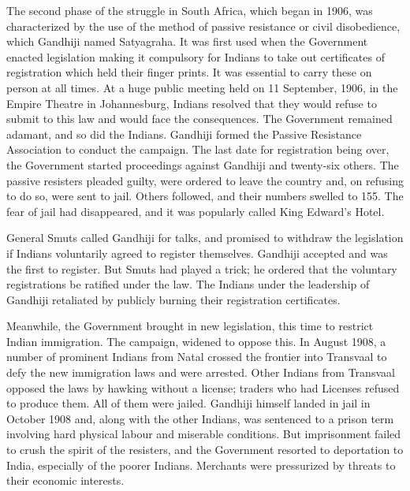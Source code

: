 The second phase of the struggle in South Africa, which began in 1906, was characterized by the use of the method of passive resistance or civil disobedience, which Gandhiji named Satyagraha. It was first used when the Government enacted legislation making it compulsory for Indians to take out certificates of registration which held their finger prints. It was essential to carry these on person at all times. At a huge public meeting held on 11 September, 1906, in the Empire Theatre in Johannesburg, Indians resolved that they would refuse to submit to this law and would face the consequences. The Government remained adamant, and so did the Indians. Gandhiji formed the Passive Resistance Association to conduct the campaign. The last date for registration being over, the Government started proceedings against Gandhiji and twenty-six others. The passive resisters pleaded guilty, were ordered to leave the country and, on refusing to do so, were sent to jail. Others followed, and their numbers swelled to 155. The fear of jail had disappeared, and it was popularly called King Edward's Hotel.

General Smuts called Gandhiji for talks, and promised to withdraw the legislation if Indians voluntarily agreed to register themselves. Gandhiji accepted and was the first to register. But Smuts had played a trick; he ordered that the voluntary registrations be ratified under the law. The Indians under the leadership of Gandhiji retaliated by publicly burning their registration certificates.

Meanwhile, the Government brought in new legislation, this time to restrict Indian immigration. The campaign, widened to oppose this. In August 1908, a number of prominent Indians from Natal crossed the frontier into Transvaal to defy the new immigration laws and were arrested. Other Indians from Transvaal opposed the laws by hawking without a license; traders who had Licenses refused to produce them. All of them were jailed. Gandhiji himself landed in jail in October 1908 and, along with the other Indians, was sentenced to a prison term involving hard physical labour and miserable conditions. But imprisonment failed to crush the spirit of the resisters, and the Government resorted to deportation to India, especially of the poorer Indians. Merchants were pressurized by threats to their economic interests.

